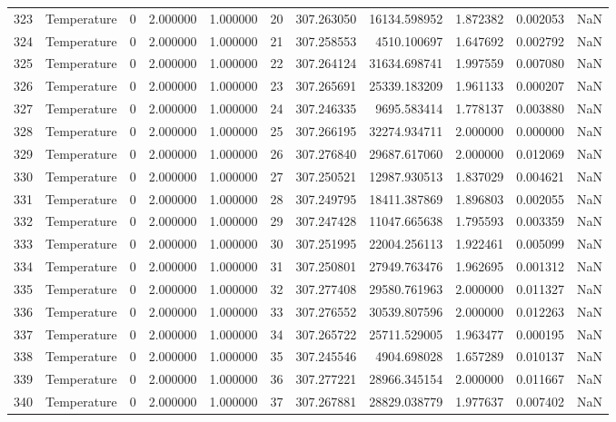 \begin{tabular}{llrrrrrrrrr}
323 & Temperature & 0 & 2.000000 & 1.000000 & 20 & 307.263050 & 16134.598952 & 1.872382 & 0.002053 & NaN \\
324 & Temperature & 0 & 2.000000 & 1.000000 & 21 & 307.258553 & 4510.100697 & 1.647692 & 0.002792 & NaN \\
325 & Temperature & 0 & 2.000000 & 1.000000 & 22 & 307.264124 & 31634.698741 & 1.997559 & 0.007080 & NaN \\
326 & Temperature & 0 & 2.000000 & 1.000000 & 23 & 307.265691 & 25339.183209 & 1.961133 & 0.000207 & NaN \\
327 & Temperature & 0 & 2.000000 & 1.000000 & 24 & 307.246335 & 9695.583414 & 1.778137 & 0.003880 & NaN \\
328 & Temperature & 0 & 2.000000 & 1.000000 & 25 & 307.266195 & 32274.934711 & 2.000000 & 0.000000 & NaN \\
329 & Temperature & 0 & 2.000000 & 1.000000 & 26 & 307.276840 & 29687.617060 & 2.000000 & 0.012069 & NaN \\
330 & Temperature & 0 & 2.000000 & 1.000000 & 27 & 307.250521 & 12987.930513 & 1.837029 & 0.004621 & NaN \\
331 & Temperature & 0 & 2.000000 & 1.000000 & 28 & 307.249795 & 18411.387869 & 1.896803 & 0.002055 & NaN \\
332 & Temperature & 0 & 2.000000 & 1.000000 & 29 & 307.247428 & 11047.665638 & 1.795593 & 0.003359 & NaN \\
333 & Temperature & 0 & 2.000000 & 1.000000 & 30 & 307.251995 & 22004.256113 & 1.922461 & 0.005099 & NaN \\
334 & Temperature & 0 & 2.000000 & 1.000000 & 31 & 307.250801 & 27949.763476 & 1.962695 & 0.001312 & NaN \\
335 & Temperature & 0 & 2.000000 & 1.000000 & 32 & 307.277408 & 29580.761963 & 2.000000 & 0.011327 & NaN \\
336 & Temperature & 0 & 2.000000 & 1.000000 & 33 & 307.276552 & 30539.807596 & 2.000000 & 0.012263 & NaN \\
337 & Temperature & 0 & 2.000000 & 1.000000 & 34 & 307.265722 & 25711.529005 & 1.963477 & 0.000195 & NaN \\
338 & Temperature & 0 & 2.000000 & 1.000000 & 35 & 307.245546 & 4904.698028 & 1.657289 & 0.010137 & NaN \\
339 & Temperature & 0 & 2.000000 & 1.000000 & 36 & 307.277221 & 28966.345154 & 2.000000 & 0.011667 & NaN \\
340 & Temperature & 0 & 2.000000 & 1.000000 & 37 & 307.267881 & 28829.038779 & 1.977637 & 0.007402 & NaN \\

\end{tabular}
